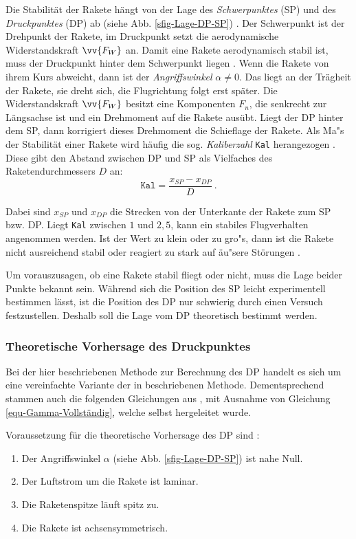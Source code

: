 \documentclass[10pt,a4paper]{article}
\begin{document}
Die Stabilität der Rakete hängt von der Lage des \textit{Schwerpunktes} (SP) und des \textit{Druckpunktes} (DP) ab (siehe Abb. \ref{sfig-Lage-DP-SP}) \cite{AbR}. Der Schwerpunkt ist der  Drehpunkt der Rakete, im Druckpunkt setzt die aerodynamische Widerstandskraft $ \vv{F_{W}} $ \cite{AbR} an.
Damit eine Rakete aerodynamisch stabil ist, muss der Druckpunkt hinter dem Schwerpunkt liegen \cite{AbR,om}. Wenn die Rakete von ihrem Kurs abweicht, dann ist der \textit{Angriffswinkel} $\alpha \neq 0$. Das liegt an der Trägheit der Rakete, sie dreht sich, die Flugrichtung folgt erst später. Die Widerstandskraft $\vv{F_{W}}$ besitzt eine Komponenten $F_{n}$, die senkrecht zur Längsachse ist und ein Drehmoment auf die Rakete ausübt. Liegt der DP hinter dem SP, dann korrigiert dieses Drehmoment die Schieflage der Rakete.
Als Ma"s der Stabilität einer Rakete wird häufig die sog. \textit{Kaliberzahl} \texttt{Kal} herangezogen \cite{AbR,dl,om,sn}. Diese gibt den Abstand zwischen DP und SP als Vielfaches des Raketendurchmessers $D$ an:
\begin{equation}
\mathtt{Kal} = \frac{x_{SP}-x_{DP}}{D} \ .
\end{equation}

\noindent
Dabei sind $x_{SP}$ und $x_{DP}$ die Strecken von der Unterkante der Rakete zum SP bzw. DP. Liegt \texttt{Kal} zwischen $1$ und $2,5$, kann ein stabiles Flugverhalten angenommen werden. Ist der Wert zu klein oder zu gro"s, dann ist die Rakete nicht ausreichend stabil oder reagiert zu stark auf äu"sere Störungen \cite{om}.

Um vorauszusagen, ob eine Rakete stabil fliegt oder nicht, muss die Lage beider Punkte bekannt sein. Während sich die Position des SP leicht experimentell bestimmen lässt, ist die Position des DP nur schwierig durch einen Versuch festzustellen. Deshalb soll die Lage vom DP theoretisch bestimmt werden.


\subsubsection{Theoretische Vorhersage des Druckpunktes}

\label{Theorie-Stabi-Sec}
Bei der hier beschriebenen Methode zur Berechnung des DP handelt es sich um eine vereinfachte Variante der in \cite{sn} beschriebenen Methode. Dementsprechend stammen auch die folgenden Gleichungen aus \cite{sn}, mit Ausnahme von Gleichung \eqref{equ-Gamma-Vollständig}, welche selbst hergeleitet wurde.
\medskip

\noindent
Voraussetzung für die theoretische Vorhersage des DP sind \cite{sn}:
\begin{enumerate}
	\item Der Angriffswinkel $ \alpha $ (siehe Abb. \ref{sfig-Lage-DP-SP}) ist nahe Null.
	\item Der Luftstrom um die Rakete ist laminar.
	\item Die Raketenspitze läuft spitz zu.
	\item Die Rakete ist achsensymmetrisch.
\end{enumerate}
\end{document}
